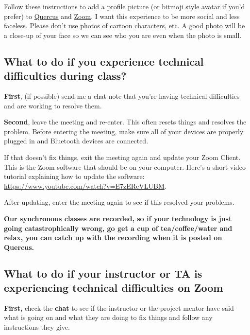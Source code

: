 \documentclass[
  openany]{book}
\begin{document}
Follow these instructions to add a profile picture (or bitmoji style avatar if you'd prefer) to \href{https://community.canvaslms.com/docs/DOC-10599-4212710334}{Quercus} and \href{https://support.zoom.us/hc/en-us/articles/201363203-Customizing-your-profile}{Zoom}. I want this experience to be more social and less faceless. Please don't use photos of cartoon characters, etc. A good photo will be a close-up of your face so we can see who you are even when the photo is small.

\hypertarget{what-to-do-if-you-experience-technical-difficulties-during-class}{%
\subsection{What to do if you experience technical difficulties during class?}\label{what-to-do-if-you-experience-technical-difficulties-during-class}}

\textbf{First}, (if possible) send me a chat note that you're having technical difficulties and are working to resolve them.

\textbf{Second}, leave the meeting and re-enter. This often resets things and resolves the problem. Before entering the meeting, make sure all of your devices are properly plugged in and Bluetooth devices are connected.

If that doesn't fix things, exit the meeting again and update your Zoom Client. This is the Zoom software that should be on your computer. Here's a short video tutorial explaining how to update the software: \url{https://www.youtube.com/watch?v=E7zERcVLUBM}.

After updating, enter the meeting again to see if this resolved your problems.

\textbf{Our synchronous classes are recorded, so if your technology is just going catastrophically wrong, go get a cup of tea/coffee/water and relax, you can catch up with the recording when it is posted on Quercus.}

\hypertarget{what-to-do-if-your-instructor-or-ta-is-experiencing-technical-difficulties-on-zoom}{%
\subsection{What to do if your instructor or TA is experiencing technical difficulties on Zoom}\label{what-to-do-if-your-instructor-or-ta-is-experiencing-technical-difficulties-on-zoom}}

\textbf{First,} check the \textbf{chat} to see if the instructor or the project mentor have said what is going on and what they are doing to fix things and follow any instructions they give.
\end{document}
